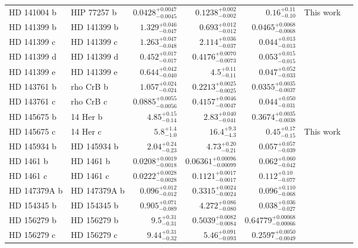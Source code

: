 \begin{longtable*}{llrrrrr}
HD 141004 b & HIP 77257 b & $0.0428^{+0.0047}_{-0.0045}$ & $0.1238^{+0.002}_{-0.002}$ & $0.16^{+0.11}_{-0.10}$ & This work & \\
HD 141399 b & HD 141399 b & $1.329^{+0.046}_{-0.047}$ & $0.693^{+0.012}_{-0.012}$ & $0.0465^{+0.0068}_{-0.0068}$ & \cite{Vogt14} & \\
HD 141399 c & HD 141399 c & $1.263^{+0.047}_{-0.048}$ & $2.114^{+0.036}_{-0.037}$ & $0.044^{+0.013}_{-0.013}$ & \cite{Vogt14} & \\
HD 141399 d & HD 141399 d & $0.452^{+0.017}_{-0.017}$ & $0.4176^{+0.0070}_{-0.0073}$ & $0.053^{+0.015}_{-0.015}$ & \cite{Vogt14} & \\
HD 141399 e & HD 141399 e & $0.644^{+0.042}_{-0.040}$ & $4.5^{+0.11}_{-0.11}$ & $0.047^{+0.052}_{-0.033}$ & \cite{Vogt14} & \\
HD 143761 b & rho CrB b & $1.057^{+0.024}_{-0.024}$ & $0.2213^{+0.0025}_{-0.0025}$ & $0.0355^{+0.0035}_{-0.0037}$ & \cite{Noyes97} & \\
HD 143761 c & rho CrB c & $0.0885^{+0.0055}_{-0.0056}$ & $0.4157^{+0.0046}_{-0.0047}$ & $0.044^{+0.050}_{-0.031}$ & \cite{Fulton16} & \\
HD 145675 b & 14 Her b & $4.85^{+0.15}_{-0.14}$ & $2.83^{+0.040}_{-0.041}$ & $0.3674^{+0.0035}_{-0.0038}$ & \cite{Wittenmyer07} & \\
HD 145675 c & 14 Her c & $5.8^{+1.4}_{-1.0}$ & $16.4^{+9.3}_{-4.3}$ & $0.45^{+0.17}_{-0.15}$ & This work & \\
HD 145934 b & HD 145934 b & $2.04^{+0.24}_{-0.23}$ & $4.73^{+0.20}_{-0.21}$ & $0.057^{+0.057}_{-0.039}$ & \cite{Feng15} & \\
HD 1461 b & HD 1461 b & $0.0208^{+0.0019}_{-0.0018}$ & $0.06361^{+0.00096}_{-0.00099}$ & $0.062^{+0.060}_{-0.042}$ & \cite{Rivera10} & \\
HD 1461 c & HD 1461 c & $0.0222^{+0.0028}_{-0.0028}$ & $0.1121^{+0.0017}_{-0.0017}$ & $0.112^{+0.10}_{-0.077}$ & \cite{Mayor11} & \\
HD 147379A b & HD 147379A b & $0.096^{+0.012}_{-0.012}$ & $0.3315^{+0.0024}_{-0.0024}$ & $0.096^{+0.110}_{-0.068}$ & \cite{Reiners18} & \\
HD 154345 b & HD 154345 b & $0.905^{+0.071}_{-0.089}$ & $4.272^{+0.086}_{-0.080}$ & $0.038^{+0.036}_{-0.027}$ & \cite{Wright07} & \\
HD 156279 b & HD 156279 b & $9.5^{+0.31}_{-0.31}$ & $0.5039^{+0.0082}_{-0.0084}$ & $0.64779^{+0.00068}_{-0.00066}$ & \cite{Diaz12} & \\
HD 156279 c & HD 156279 c & $9.44^{+0.31}_{-0.32}$ & $5.46^{+0.091}_{-0.093}$ & $0.2597^{+0.0050}_{-0.0049}$ & \cite{Bryan16} & \\

\end{longtable*}

